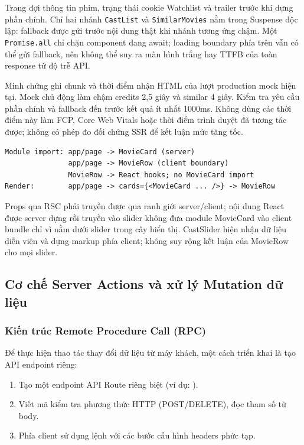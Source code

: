 \documentclass[12pt,a4paper]{extarticle}
\begin{document}
Trang  đợi thông tin phim, trạng thái cookie Watchlist và trailer trước khi dựng phần chính. Chỉ hai nhánh \texttt{CastList} và \texttt{SimilarMovies} nằm trong Suspense độc lập: fallback được gửi trước nội dung thật khi nhánh tương ứng chậm. Một \texttt{Promise.all} chỉ chặn component đang await; loading boundary phía trên vẫn có thể gửi fallback, nên không thể suy ra màn hình trắng hay TTFB của toàn response từ độ trễ API.

Minh chứng  ghi chunk và thời điểm nhận HTML của lượt production mock hiện tại. Mock chủ động làm chậm credits 2,5 giây và similar 4 giây. Kiểm tra yêu cầu phần chính và fallback đến trước kết quả ít nhất 1000ms. Không dùng các thời điểm này làm FCP, Core Web Vitals hoặc thời điểm trình duyệt đã tương tác được; không có phép đo đối chứng SSR để kết luận mức tăng tốc.

\begin{lstlisting}[language={},numbers=none]
Module import: app/page -> MovieCard (server)
               app/page -> MovieRow (client boundary)
               MovieRow -> React hooks; no MovieCard import
Render:        app/page -> cards={<MovieCard ... />} -> MovieRow
\end{lstlisting}
Props qua RSC phải truyền được qua ranh giới server/client; nội dung React được server dựng rồi truyền vào slider không đưa module MovieCard vào client bundle chỉ vì nằm dưới slider trong cây hiển thị. CastSlider hiện nhận dữ liệu diễn viên và dựng markup phía client; không suy rộng kết luận của MovieRow cho mọi slider.

\subsection{Cơ chế Server Actions và xử lý Mutation dữ liệu}

\subsubsection{Kiến trúc Remote Procedure Call (RPC)}
Để thực hiện thao tác thay đổi dữ liệu từ máy khách, một cách triển khai là tạo API endpoint riêng:
\begin{enumerate}[noitemsep]
    \item Tạo một endpoint API Route riêng biệt (ví dụ: ).
    \item Viết mã kiểm tra phương thức HTTP (POST/DELETE), đọc tham số từ body.
    \item Phía client sử dụng lệnh  với các bước cấu hình headers phức tạp.
\end{enumerate}
\end{document}
